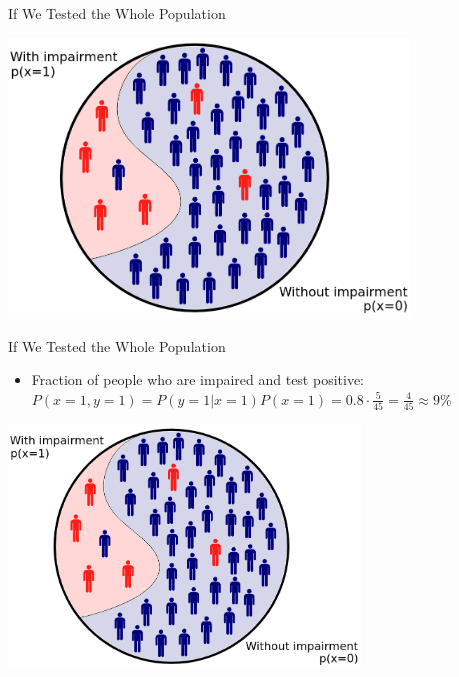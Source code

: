 \documentclass{beamer}
\begin{document}
\begin{frame}{If We Tested the Whole Population}
  \begin{center}
    \includegraphics[width=0.8\textwidth]{whole_population.png}
  \end{center}
\end{frame}

\begin{frame}{If We Tested the Whole Population}
  \begin{itemize}
    \item Fraction of people who are impaired and test positive:
      \(
        P(x=1, y=1) = P(y = 1|x = 1)P(x = 1) = 0.8 \cdot \frac{5}{45} = \frac{4}{45} \approx 9\%
      \)
  \end{itemize}
  \begin{center}
    \includegraphics[width=0.7\textwidth]{whole_population.png}
  \end{center}
\end{frame}
\end{document}
